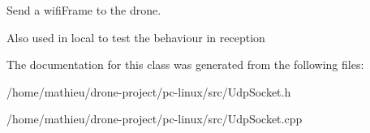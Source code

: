 Send a wifi\-Frame to the drone. 

Also used in local to test the behaviour in reception 

The documentation for this class was generated from the following files\-:\begin{DoxyCompactItemize}
\item 
/home/mathieu/drone-\/project/pc-\/linux/src/Udp\-Socket.\-h\item 
/home/mathieu/drone-\/project/pc-\/linux/src/Udp\-Socket.\-cpp\end{DoxyCompactItemize}
